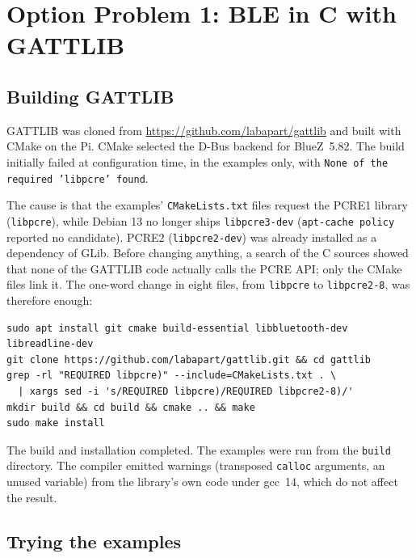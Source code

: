 \documentclass[11pt,a4paper]{article}
\begin{document}
\section{Option Problem 1: BLE in C with GATTLIB}

\subsection{Building GATTLIB}

GATTLIB was cloned from \url{https://github.com/labapart/gattlib} and built
with CMake on the Pi. CMake selected the D-Bus backend for BlueZ~5.82. The
build initially failed at configuration time, in the examples only, with
\texttt{None of the required 'libpcre' found}.

The cause is that the examples' \texttt{CMakeLists.txt} files request the
PCRE1 library (\texttt{libpcre}), while Debian 13 no longer ships
\texttt{libpcre3-dev} (\texttt{apt-cache policy} reported no candidate).
PCRE2 (\texttt{libpcre2-dev}) was already installed as a dependency of GLib.
Before changing anything, a search of the C sources showed that none of the
GATTLIB code actually calls the PCRE API; only the CMake files link it. The
one-word change in eight files, from \texttt{libpcre} to \texttt{libpcre2-8},
was therefore enough:

\begin{lstlisting}[style=shellstyle,caption={Build steps, including the PCRE workaround.}]
sudo apt install git cmake build-essential libbluetooth-dev libreadline-dev
git clone https://github.com/labapart/gattlib.git && cd gattlib
grep -rl "REQUIRED libpcre)" --include=CMakeLists.txt . \
  | xargs sed -i 's/REQUIRED libpcre)/REQUIRED libpcre2-8)/'
mkdir build && cd build && cmake .. && make
sudo make install
\end{lstlisting}

The build and installation completed. The examples were run from the
\texttt{build} directory. The compiler emitted warnings (transposed
\texttt{calloc} arguments, an unused variable) from the library's own code
under gcc~14, which do not affect the result.

\subsection{Trying the examples}
\end{document}
